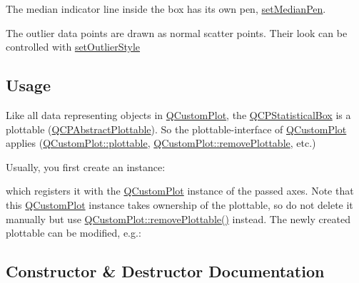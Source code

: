 The median indicator line inside the box has its own pen, \hyperlink{classQCPStatisticalBox_a7260ac55b669f5d0a74f16d5ca84c52c}{set\+Median\+Pen}.

The outlier data points are drawn as normal scatter points. Their look can be controlled with \hyperlink{classQCPStatisticalBox_ad5241943422eb8e58360a97e99ad6aa7}{set\+Outlier\+Style}\hypertarget{classQCPStatisticalBox_qcpstatisticalbox-usage}{}\subsection{Usage}\label{classQCPStatisticalBox_qcpstatisticalbox-usage}
Like all data representing objects in \hyperlink{classQCustomPlot}{Q\+Custom\+Plot}, the \hyperlink{classQCPStatisticalBox}{Q\+C\+P\+Statistical\+Box} is a plottable (\hyperlink{classQCPAbstractPlottable}{Q\+C\+P\+Abstract\+Plottable}). So the plottable-\/interface of \hyperlink{classQCustomPlot}{Q\+Custom\+Plot} applies (\hyperlink{classQCustomPlot_a32de81ff53e263e785b83b52ecd99d6f}{Q\+Custom\+Plot\+::plottable}, \hyperlink{classQCustomPlot_af3dafd56884208474f311d6226513ab2}{Q\+Custom\+Plot\+::remove\+Plottable}, etc.)

Usually, you first create an instance\+: 
\begin{DoxyCodeInclude}
\end{DoxyCodeInclude}
which registers it with the \hyperlink{classQCustomPlot}{Q\+Custom\+Plot} instance of the passed axes. Note that this \hyperlink{classQCustomPlot}{Q\+Custom\+Plot} instance takes ownership of the plottable, so do not delete it manually but use \hyperlink{classQCustomPlot_af3dafd56884208474f311d6226513ab2}{Q\+Custom\+Plot\+::remove\+Plottable()} instead. The newly created plottable can be modified, e.\+g.\+: 
\begin{DoxyCodeInclude}
\end{DoxyCodeInclude}


\subsection{Constructor \& Destructor Documentation}
